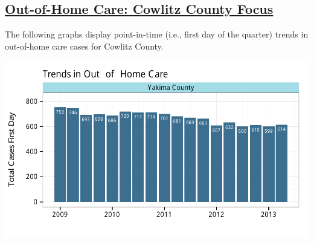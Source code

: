 \documentclass{article}\usepackage[]{graphicx}\usepackage[]{color}
\makeatletter
\def\maxwidth{ %
  \ifdim\Gin@nat@width>\linewidth
    \linewidth
  \else
    \Gin@nat@width
  \fi
}
\newenvironment{knitrout}{}{} %
\makeatother
\begin{document}
\begin{minipage}{\textwidth}
\subsection{\href{http://www.partnersforourchildren.org/child-well-being/visualizations/out-home-care/trends}
 {Out-of-Home Care: Cowlitz County Focus}
}
The following graphs display point-in-time (i.e., first day of the quarter) trends in out-of-home care cases for
Cowlitz County.\\[1pt]
\begin{knitrout}
\color{fgcolor}

{\centering \includegraphics[width=\maxwidth]{figure/ooh_focus} 

}



\end{knitrout}

\end{minipage}
\end{document}
